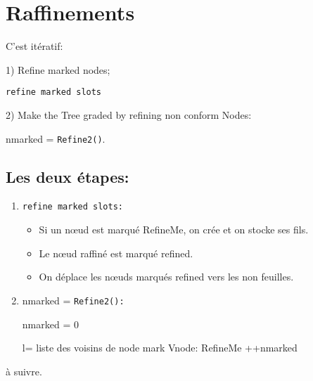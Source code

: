 \documentclass[10pt]{article}
\begin{document}
\lstset{language=C++}
%
%
\section{Raffinements}
C'est itératif:\smallskip

\begin{algorithm}[H]

     {
       1) Refine marked nodes;
       
           {
             {
             \texttt{refine marked slots}\;
           }
           }

           2) Make the Tree graded by refining non conform Nodes:

           nmarked = \texttt{Refine2()}.
       }{}
\end{algorithm}
\subsection{Les deux étapes:}
\begin{enumerate}
\item \texttt{refine marked slots:}
  \begin{itemize}
    \item Si un nœud est marqué \og RefineMe\fg{}, on crée et on
      stocke ses fils.
    \item Le nœud raffiné est marqué \og refined\fg{}.
    \item On déplace les nœuds marqués \og refined\fg{} vers les non feuilles.
  \end{itemize}
\item nmarked = \texttt{Refine2():}
  
  \begin{algorithm}[H]
    nmarked = 0\;
    
        {
              {
                l= liste des voisins de node\;
                    {
                      {
                        mark Vnode: RefineMe\;
                        ++nmarked
                        }{}
                    }
                    
              }
              }

             
  \end{algorithm}
\end{enumerate}

à suivre.
\end{document}
